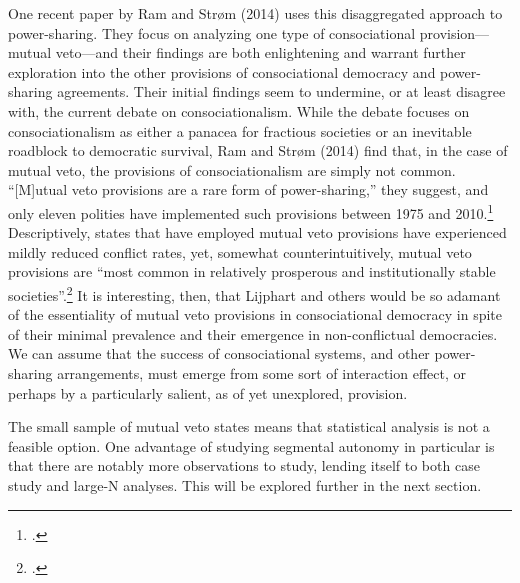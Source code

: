 \documentclass[12pt]{article}
\begin{document}
One recent paper by Ram and Strøm (2014) uses this disaggregated approach to power-sharing. They focus on analyzing one type of consociational provision---mutual veto---and their findings are both enlightening and warrant further exploration into the other provisions of consociational democracy and power-sharing agreements. Their initial findings seem to undermine, or at least disagree with, the current debate on consociationalism. While the debate focuses on consociationalism as either a panacea for fractious societies or an inevitable roadblock to democratic survival, Ram and Strøm (2014) find that, in the case of mutual veto, the provisions of consociationalism are simply not common. ``[M]utual veto provisions are a rare form of power-sharing,'' they suggest, and only eleven polities have implemented such provisions between 1975 and 2010.\footcite[345]{ram_mutual_2014} Descriptively, states that have employed mutual veto provisions have experienced mildly reduced conflict rates, yet, somewhat counterintuitively, mutual veto provisions are ``most common in relatively prosperous and institutionally stable societies''.\footcite[355]{ram_mutual_2014} It is interesting, then, that Lijphart and others would be so adamant of the essentiality of mutual veto provisions in consociational democracy in spite of their minimal prevalence and their emergence in non-conflictual democracies. We can assume that the success of consociational systems, and other power-sharing arrangements, must emerge from some sort of interaction effect, or perhaps by a particularly salient, as of yet unexplored, provision.

The small sample of mutual veto states means that statistical analysis is not a feasible option. One advantage of studying segmental autonomy in particular is that there are notably more observations to study, lending itself to both case study and large-N analyses. This will be explored further in the next section.  
\end{document}
